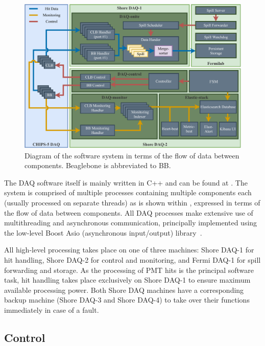 \begin{figure} %
    \includegraphics[width=\textwidth]{diagrams/5-daq/daq_software.pdf}
    \caption[Diagram of the \chipsfive software system in terms of the flow of data between
    components] {Diagram of the \chipsfive software system in terms of the flow of data between
    components. Beaglebone is abbreviated to BB.}
    \label{fig:daq_software}
\end{figure}

The DAQ software itself is mainly written in C++ and can be found at .
The system is comprised of multiple processes containing multiple components each (usually
processed on separate threads) as is shown within , expressed in terms
of the flow of data between components. All DAQ processes make extensive use of multithreading and
asynchronous communication, principally implemented using the low-level Boost Asio (asynchronous
input/output) library~\cite{boost2020}. 

All high-level processing takes place on one of three machines: Shore DAQ-1 for hit handling,
Shore DAQ-2 for control and monitoring, and Fermi DAQ-1 for \numi spill forwarding and storage. As
the processing of PMT hits is the principal software task, hit handling takes place exclusively on
Shore DAQ-1 to ensure maximum available processing power. Both Shore DAQ machines have a
corresponding backup machine (Shore DAQ-3 and Shore DAQ-4) to take over their functions
immediately in case of a fault.

\subsection{Control} %
\label{sec:daq_soft_control} %

